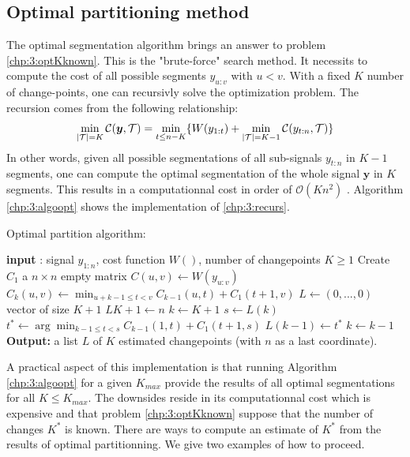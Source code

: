 \subsection{Optimal partitioning method}

The optimal segmentation algorithm brings an answer to problem \ref{chp:3:optKknown}. This is the "brute-force" search method. It necessits to compute the cost of all possible segments $y_{u:v}$ with $u<v$.  With a fixed $K$ number of change-points, one can recursivly solve the optimization problem. The recursion comes from the following relationship: 
\begin{equation}\label{chp:3:recurs}
\min_{\lvert{\mathcal T}\rvert = K}\mathcal{C}(\bm y, {\mathcal T}) = \min_{t \leq n-K}\{W(y_{1:t})+\min_{\lvert{\mathcal T}\rvert = K-1}\mathcal{C}(y_{t:n},{\mathcal T})\} 
\end{equation}
In other words, given all possible segmentations of all sub-signals $y_{t:n}$ in $K-1$ segments, one can compute the optimal segmentation of the whole signal $\bm y$ in $K$ segments. This results in a computationnal cost in order of $\mathcal{O}(Kn^2)$ \cite{haynes2017}. Algorithm \ref{chp:3:algoopt} shows the implementation of \ref{chp:3:recurs}. 

\begin{algorithm}[ht]
\caption{Optimal partition algorithm:}\label{chp:3:algoopt}
\begin{algorithmic}

\State \textbf{input} : signal $y_{1:n}$, cost function $W()$, number of changepoints $K \geq 1$
\State Create $C_1$ a $n\times n$ empty matrix
  \State $C(u,v) \gets W(y_{u:v})$
\EndFor
{}
      \State $C_k(u,v) \gets \min_{u+k-1 \leq t < v} C_{k-1}(u,t) + C_1(t+1,v)$ 
    \EndFor
  \EndFor
\EndIf
\State $L \gets (0,...,0)$ vector of size $K+1$
\State $L{K+1} \gets n$
\State $k \gets K+1$
  \State $s \gets L(k)$
  \State $t^* \gets \arg\min_{k-1\leq t < s}C_{k-1}(1,t)+C_1(t+1,s)$
  \State $L(k-1) \gets t^*$
  \State $k \gets k-1$
\EndWhile
\State \textbf{Output:} a list $L$ of $K$ estimated changepoints (with $n$ as a last coordinate).
\end{algorithmic}
\end{algorithm} 

A practical aspect of this implementation is that running Algorithm \ref{chp:3:algoopt} for a given $K_{max}$ provide the results of all optimal segmentations for all $K \leq K_{max}$. The downsides reside in its computationnal cost which is expensive and that problem \ref{chp:3:optKknown} suppose that the number of changes $K^*$ is known. There are ways to compute an estimate of $K^*$ from the results of optimal partitionning. We give two examples of how to proceed.

